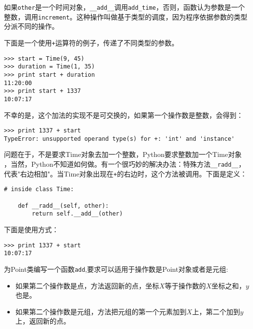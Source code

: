 
如果{\tt other}是一个时间对象，\verb"__add__"调用\verb"add_time"，否则，函数认为参数是一个整数，调用{\tt increment}。这种操作叫做基于类型的调度，因为程序依据参数的类型分派不同的操作。


下面是一个使用{\tt +}运算符的例子，传递了不同类型的参数。

\beforeverb
\begin{verbatim}
>>> start = Time(9, 45)
>>> duration = Time(1, 35)
>>> print start + duration
11:20:00
>>> print start + 1337
10:07:17
\end{verbatim}
\afterverb
%

不幸的是，这个加法的实现不是可交换的，如果第一个操作数是整数，会得到：

\beforeverb
\begin{verbatim}
>>> print 1337 + start
TypeError: unsupported operand type(s) for +: 'int' and 'instance'
\end{verbatim}
\afterverb


问题在于，不是要求Time对象去加一个整数，Python要求整数加一个Time对象
，当然，Python不知道如何做。有一个很巧妙的解决办法：特殊方法\verb"__radd__"，代表"右边相加"。当Time对象出现在{\tt +}的右边时，这个方法被调用。下面是定义：


\beforeverb
\begin{verbatim}
# inside class Time:

    def __radd__(self, other):
        return self.__add__(other)
\end{verbatim}
\afterverb
%
下面是使用方式：

\beforeverb
\begin{verbatim}
>>> print 1337 + start
10:07:17
\end{verbatim}
\afterverb
%

\begin{ex}

为Point类编写一个函数{\tt add},要求可以适用于操作数是Point对象或者是元组:

\begin{itemize}

\item 如果第二个操作数是点，方法返回新的点，坐标$X$等于操作数的$X$坐标之和，$y$也是。

\item 如果第二个操作数是元组，方法把元组的第一个元素加到$X$上，第二个加到$y$上，返回新的点。

\end{itemize}
\end{ex}

